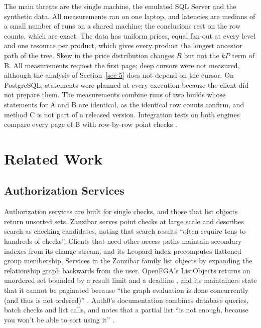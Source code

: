 \documentclass[conference]{IEEEtran}
\begin{document}
The main threats are the single machine, the emulated SQL Server and the synthetic data. All measurements ran on one laptop, and latencies are medians of a small number of runs on a shared machine; the conclusions rest on the row counts, which are exact. The data has uniform prices, equal fan-out at every level and one resource per product, which gives every product the longest ancestor path of the tree. Skew in the price distribution changes \(R\) but not the \(kP\) term of B. All measurements request the first page; deep cursors were not measured, although the analysis of Section~\ref{sec-5} does not depend on the cursor. On PostgreSQL, statements were planned at every execution because the client did not prepare them. The measurements combine runs of two builds whose statements for A and B are identical, as the identical row counts confirm, and method C is not part of a released version. Integration tests on both engines compare every page of B with row-by-row point checks \cite{ref18}.

\section{Related Work}\label{sec-8}

\subsection{Authorization Services}\label{sec-8-1}

Authorization services are built for single checks, and those that list objects return unsorted sets. Zanzibar \cite{ref5} serves point checks at large scale and describes search as checking candidates, noting that search results ``often require tens to hundreds of checks''. Clients that need other access paths maintain secondary indexes from its change stream, and its Leopard index precomputes flattened group membership. Services in the Zanzibar family list objects by expanding the relationship graph backwards from the user. OpenFGA's ListObjects returns an unordered set bounded by a result limit and a deadline \cite{ref9}, and its maintainers state that it cannot be paginated because ``the graph evaluation is done concurrently (and thus is not ordered)'' \cite{ref22}. Auth0's documentation combines database queries, batch checks and list calls, and notes that a partial list ``is not enough, because you won't be able to sort using it'' \cite{ref23}.
\end{document}
